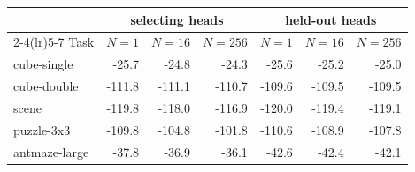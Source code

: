 \begin{tabular}{l rrr rrr}
\toprule
 & \multicolumn{3}{c}{selecting heads} & \multicolumn{3}{c}{held-out heads} \\
\cmidrule(lr){2-4}\cmidrule(lr){5-7}
Task & $N{=}1$ & $N{=}16$ & $N{=}256$ & $N{=}1$ & $N{=}16$ & $N{=}256$ \\
\midrule
cube-single & -25.7 & -24.8 & -24.3 & -25.6 & -25.2 & -25.0 \\
cube-double & -111.8 & -111.1 & -110.7 & -109.6 & -109.5 & -109.5 \\
scene & -119.8 & -118.0 & -116.9 & -120.0 & -119.4 & -119.1 \\
puzzle-3x3 & -109.8 & -104.8 & -101.8 & -110.6 & -108.9 & -107.8 \\
antmaze-large & -37.8 & -36.9 & -36.1 & -42.6 & -42.4 & -42.1 \\
\bottomrule
\end{tabular}

